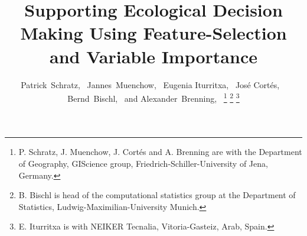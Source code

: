 \documentclass[letterpaper, journal]{IEEEtran}
\begin{document}
%
\title{Supporting Ecological Decision Making Using Feature-Selection and Variable Importance}
%
%
%

\author{Patrick~Schratz,~
        Jannes~Muenchow,~
        Eugenia Iturritxa,~
        José Cortés, ~
        Bernd~Bischl,~
        and Alexander~Brenning,~
\thanks{P. Schratz, J. Muenchow, J. Cortés and A. Brenning are with the Department
of Geography, GIScience group, Friedrich-Schiller-University of Jena, Germany.}%
\thanks{B. Bischl is head of the computational statistics group at the Department of Statistics, Ludwig-Maximilian-University Munich.}%
\thanks{E. Iturritxa is with NEIKER Tecnalia, Vitoria-Gasteiz, Arab, Spain.}%
}

%
%
\end{document}
